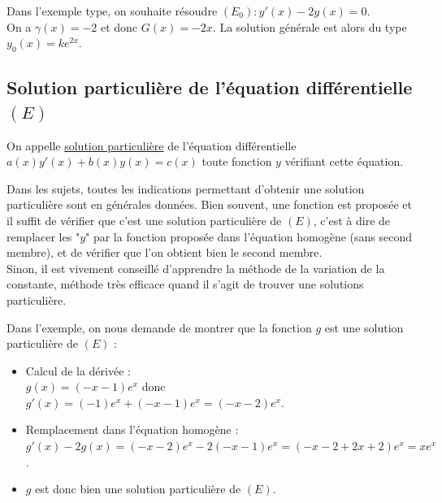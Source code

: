 \documentclass[french]{book}
\begin{document}
\begin{exemple}
Dans l'exemple type, on souhaite résoudre $(E_0):y'(x)-2y(x)=0$. \\
On a $\gamma(x)=-2$ et donc $G(x)=-2x$. La solution générale est alors du type $y_0(x)=ke^{2x}$.
\end{exemple}




\subsection{Solution particulière de l'équation différentielle $(E)$}%

\begin{defn}
On appelle \underline{solution particulière} de l'équation différentielle $a(x)y'(x)+b(x)y(x)= c(x)$ toute fonction $y$ vérifiant cette équation.
\end{defn}

Dans les sujets, toutes les indications permettant d'obtenir une solution particulière sont en générales données. Bien souvent, une fonction est proposée et il suffit de vérifier que c'est une solution particulière de $(E)$, c'est à dire de remplacer les "$y$" par la fonction proposée dans l'équation homogène (sans second membre), et de vérifier que l'on obtient bien le second membre.\\

Sinon, il est vivement conseillé d'apprendre la méthode de la variation de la constante, méthode très efficace quand il s'agit de trouver une solutions particulière.

\begin{exemple}
Dans l'exemple, on nous demande de montrer que la fonction $g$ est une solution particulière de $(E)$ :
\begin{itemize}
   \item Calcul de la dérivée : \\
   \hspace*{0.3cm} $g(x)=(-x-1)e^x$ donc $g'(x) =(-1)e^x+(-x-1)e^x =(-x-2)e^x$.
   \item Remplacement dans l'équation homogène : \\
   \hspace*{0.3cm} $g'(x)-2g(x) =(-x-2)e^x-2(-x-1)e^x =(-x-2+2x+2)e^x = xe^x$.
   \item $g$ est donc bien une solution particulière de $(E)$.
\end{itemize}
\end{exemple}
\end{document}
